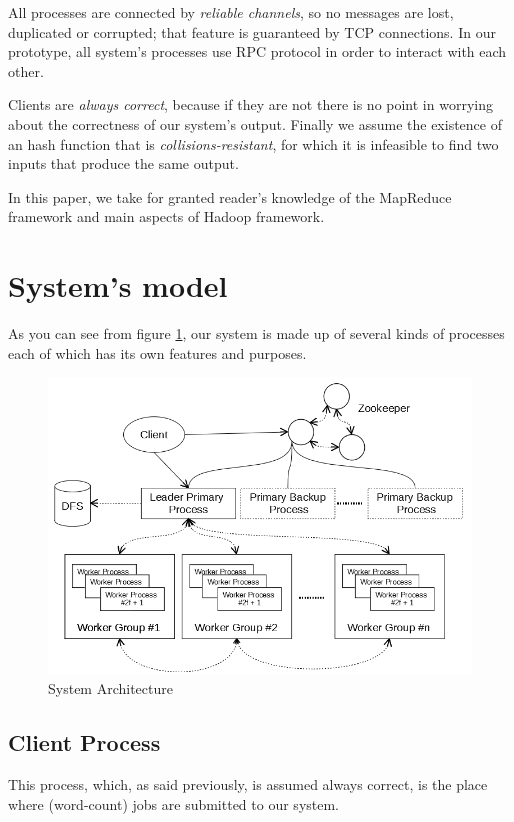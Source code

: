 \documentclass[sigchi]{acmart}
\begin{document}
All processes are connected by \textit{reliable channels}, so no messages are lost, duplicated or corrupted; that feature is guaranteed by TCP connections. In our prototype, all system's processes use RPC protocol in order to interact with each other.

Clients are \textit{always correct}, because if they are not there is no point in worrying about the correctness of our system's output. Finally we assume the existence of an hash function that is \textit{collisions-resistant}, for which it is infeasible to find two inputs that produce the same output.

In this paper, we take for granted reader's knowledge of the MapReduce framework and main aspects of Hadoop  framework.

\section{System's model}

As you can see from figure \ref{fig:model}, our system is made up of several kinds of processes each of which has its own features and purposes.

\begin{figure}[h]
  \centering
  \includegraphics[width=\linewidth]{Architecture.png}
  \caption{System Architecture}
  \label{fig:model}
\end{figure}

\subsection{Client Process}

This process, which, as said previously, is assumed always correct, is the place where (word-count) jobs are submitted to our system. 
\end{document}
